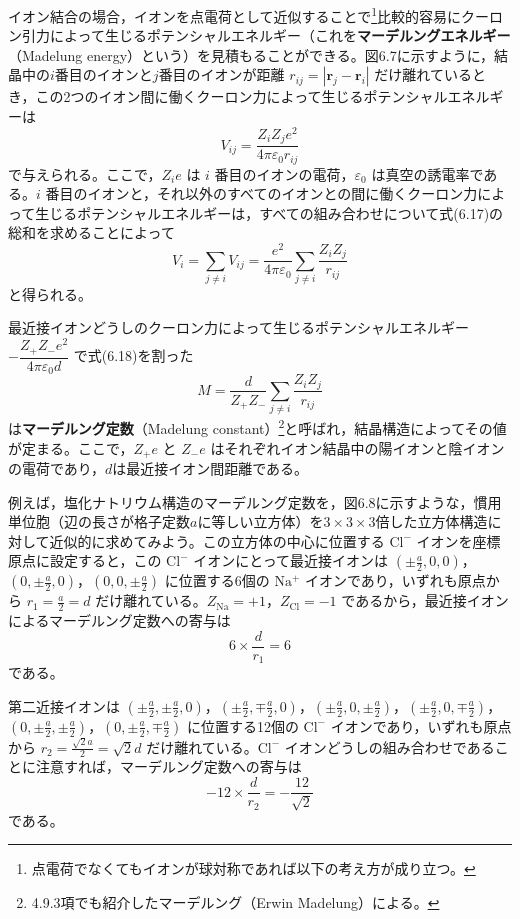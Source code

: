 \documentclass[a4paper,11pt]{ltjsarticle}
\begin{document}
イオン結合の場合，イオンを点電荷として近似することで\footnote{点電荷でなくてもイオンが球対称であれば以下の考え方が成り立つ。}比較的容易にクーロン引力によって生じるポテンシャルエネルギー（これを\textbf{マーデルングエネルギー}（Madelung energy）という）を見積もることができる。図6.7に示すように，結晶中の$i$番目のイオンと$j$番目のイオンが距離 $r_{ij} = |\bm{r}_j - \bm{r}_i|$ だけ離れているとき，この2つのイオン間に働くクーロン力によって生じるポテンシャルエネルギーは
\begin{equation}
V_{ij} = \frac{Z_i Z_j e^2}{4\pi\varepsilon_0 r_{ij}} \tag{6.17}
\end{equation}
で与えられる。ここで，$Z_i e$ は $i$ 番目のイオンの電荷，$\varepsilon_0$ は真空の誘電率である。$i$ 番目のイオンと，それ以外のすべてのイオンとの間に働くクーロン力によって生じるポテンシャルエネルギーは，すべての組み合わせについて式(6.17)の総和を求めることによって
\begin{equation}
V_i = \sum_{j\neq i} V_{ij} = \frac{e^2}{4\pi\varepsilon_0}\sum_{j\neq i}\frac{Z_i Z_j}{r_{ij}} \tag{6.18}
\end{equation}
と得られる。

最近接イオンどうしのクーロン力によって生じるポテンシャルエネルギー $-\dfrac{Z_+Z_- e^2}{4\pi\varepsilon_0 d}$ で式(6.18)を割った
\begin{equation}
M = \frac{d}{Z_+Z_-}\sum_{j\neq i}\frac{Z_i Z_j}{r_{ij}} \tag{6.19}
\end{equation}
は\textbf{マーデルング定数}（Madelung constant）\footnote{4.9.3項でも紹介したマーデルング（Erwin Madelung）による。}と呼ばれ，結晶構造によってその値が定まる。ここで，$Z_+e$ と $Z_-e$ はそれぞれイオン結晶中の陽イオンと陰イオンの電荷であり，$d$は最近接イオン間距離である。

例えば，塩化ナトリウム構造のマーデルング定数を，図6.8に示すような，慣用単位胞（辺の長さが格子定数$a$に等しい立方体）を$3\times3\times3$倍した立方体構造に対して近似的に求めてみよう。この立方体の中心に位置する $\mathrm{Cl^-}$ イオンを座標原点に設定すると，この $\mathrm{Cl^-}$ イオンにとって最近接イオンは $(\pm\frac{a}{2},0,0)$，$(0,\pm\frac{a}{2},0)$，$(0,0,\pm\frac{a}{2})$ に位置する6個の $\mathrm{Na^+}$ イオンであり，いずれも原点から $r_1 = \frac{a}{2} = d$ だけ離れている。$Z_{\mathrm{Na}}=+1$，$Z_{\mathrm{Cl}}=-1$ であるから，最近接イオンによるマーデルング定数への寄与は
\[
6 \times \frac{d}{r_1} = 6
\]
である。

第二近接イオンは $(\pm\frac{a}{2},\pm\frac{a}{2},0)$，$(\pm\frac{a}{2},\mp\frac{a}{2},0)$，$(\pm\frac{a}{2},0,\pm\frac{a}{2})$，$(\pm\frac{a}{2},0,\mp\frac{a}{2})$，$(0,\pm\frac{a}{2},\pm\frac{a}{2})$，$(0,\pm\frac{a}{2},\mp\frac{a}{2})$ に位置する12個の $\mathrm{Cl^-}$ イオンであり，いずれも原点から $r_2 = \frac{\sqrt{2}a}{2} = \sqrt{2}d$ だけ離れている。$\mathrm{Cl^-}$ イオンどうしの組み合わせであることに注意すれば，マーデルング定数への寄与は
\[
-12 \times \frac{d}{r_2} = -\frac{12}{\sqrt{2}}
\]
である。
\end{document}

